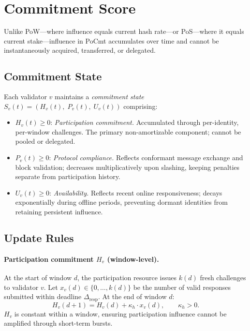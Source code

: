\documentclass[10pt,journal,twoside]{IEEEtran}
\theoremstyle{remark}
\begin{document}
	\section{Commitment Score}
	\label{sec:score}
	
	Unlike PoW---where influence equals current hash rate---or
	PoS---where it equals current stake---influence in PoCmt
	accumulates over time and cannot be instantaneously
	acquired, transferred, or delegated.
	
	\subsection{Commitment State}
	\label{ssec:state}
	
	Each validator $v$ maintains a \emph{commitment state}
	$S_v(t) = (H_v(t),\; P_v(t),\; U_v(t))$ comprising:
	
	\begin{itemize}
		
		\item $H_v(t) \geq 0$: \emph{Participation commitment.}
		Accumulated through per-identity, per-window challenges.
		The primary non-amortizable component; cannot be pooled
		or delegated.
		
		\item $P_v(t) \geq 0$: \emph{Protocol compliance.}
		Reflects conformant message exchange and block
		validation; decreases multiplicatively upon slashing,
		keeping penalties separate from participation history.
		
		\item $U_v(t) \geq 0$: \emph{Availability.}
		Reflects recent online responsiveness; decays
		exponentially during offline periods, preventing
		dormant identities from retaining persistent influence.
		
	\end{itemize}
	
	\subsection{Update Rules}
	\label{ssec:updates}
	
	\paragraph{Participation commitment $H_v$ (window-level).}
	At the start of window $d$, the participation resource
	issues $k(d)$ fresh challenges to validator $v$.
	Let $x_v(d) \in \{0, \ldots, k(d)\}$ be the number of
	valid responses submitted within deadline
	$\Delta_{\mathrm{resp}}$.
	At the end of window $d$:
	\begin{equation}
		\label{eq:hupdate}
		H_v(d+1) = H_v(d) + \kappa_h \cdot x_v(d),
		\qquad \kappa_h > 0.
	\end{equation}
	$H_v$ is constant within a window, ensuring participation
	influence cannot be amplified through short-term bursts.
	
\end{document}
